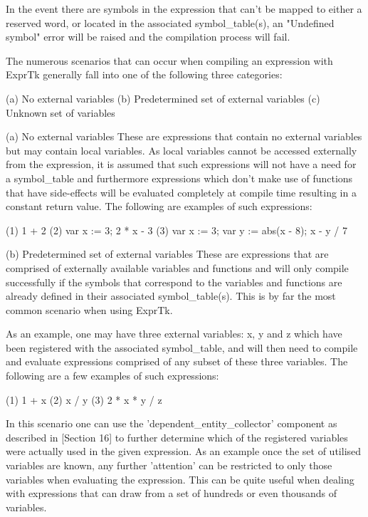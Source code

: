 In the event there are symbols in the expression that can't be  mapped
to   either   a  reserved   word,   or  located   in   the  associated
symbol\_table(s), an "Undefined  symbol" error will  be raised and  the
compilation process will fail.

The numerous  scenarios that  can occur  when compiling  an expression
with ExprTk generally fall into one of the following three categories:

(a) No external variables
(b) Predetermined set of external variables
(c) Unknown set of variables


(a) No external variables
These  are  expressions that  contain  no external  variables  but may
contain  local  variables.  As  local  variables  cannot  be  accessed
externally from the  expression, it is  assumed that such  expressions
will not have  a need for  a symbol\_table and  furthermore expressions
which  don't  make  use of  functions that  have side-effects  will be
evaluated completely at  compile time resulting  in a constant  return
value. The following are examples of such expressions:

(1) 1 + 2
(2) var x := 3; 2 * x - 3
(3) var x := 3; var y := abs(x - 8); x - y / 7


(b) Predetermined set of external variables
These  are  expressions  that are  comprised  of  externally available
variables  and functions  and will  only compile  successfully if  the
symbols that  correspond to  the variables  and functions  are already
defined in their associated symbol\_table(s).  This is by far the  most
common scenario when using ExprTk.

As an example, one may have three external variables: x, y and z which
have been registered with  the associated symbol\_table, and  will then
need to compile  and evaluate expressions  comprised of any  subset of
these  three  variables. The  following  are a  few  examples of  such
expressions:

(1) 1 + x
(2) x / y
(3) 2 * x * y / z


In  this  scenario   one  can  use   the  'dependent\_entity\_collector'
component as described in [Section  16] to further determine which  of
the registered variables were  actually used in the  given expression.
As  an example  once the  set of  utilised  variables  are known,  any
further 'attention'  can be  restricted to  only those  variables when
evaluating the expression. This can be quite useful when dealing  with
expressions that can draw from a set of hundreds or even thousands  of
variables.


